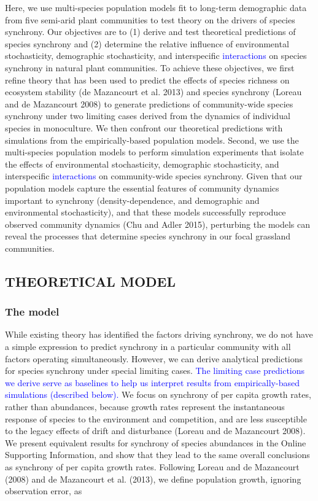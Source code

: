 \documentclass[12pt,]{article}
\begin{document}
Here, we use multi-species population models fit to long-term
demographic data from five semi-arid plant communities to test theory on
the drivers of species synchrony. Our objectives are to (1) derive and
test theoretical predictions of species synchrony and (2) determine the
relative influence of environmental stochasticity, demographic
stochasticity, and interspecific \textcolor{blue}{interactions} on
species synchrony in natural plant communities. To achieve these
objectives, we first refine theory that has been used to predict the
effects of species richness on ecosystem stability ({{de Mazancourt}} et
al. 2013) and species synchrony (Loreau and {{de Mazancourt}} 2008) to
generate predictions of community-wide species synchrony under two
limiting cases derived from the dynamics of individual species in
monoculture. We then confront our theoretical predictions with
simulations from the empirically-based population models. Second, we use
the multi-species population models to perform simulation experiments
that isolate the effects of environmental stochasticity, demographic
stochasticity, and interspecific \textcolor{blue}{interactions} on
community-wide species synchrony. Given that our population models
capture the essential features of community dynamics important to
synchrony (density-dependence, and demographic and environmental
stochasticity), and that these models successfully reproduce observed
community dynamics (Chu and Adler 2015), perturbing the models can
reveal the processes that determine species synchrony in our focal
grassland communities.

\subsection{THEORETICAL MODEL}\label{theoretical-model}

\subsubsection{The model}\label{the-model}

While existing theory has identified the factors driving synchrony, we
do not have a simple expression to predict synchrony in a particular
community with all factors operating simultaneously. However, we can
derive analytical predictions for species synchrony under special
limiting cases.
\textcolor{blue}{The limiting case predictions we derive serve as baselines to help us interpret results from empirically-based simulations (described below).}
We focus on synchrony of per capita growth rates, rather than
abundances, because growth rates represent the instantaneous response of
species to the environment and competition, and are less susceptible to
the legacy effects of drift and disturbance (Loreau and {{de
Mazancourt}} 2008). We present equivalent results for synchrony of
species abundances in the Online Supporting Information, and show that
they lead to the same overall conclusions as synchrony of per capita
growth rates. Following Loreau and {{de Mazancourt}} (2008) and {{de
Mazancourt}} et al. (2013), we define population growth, ignoring
observation error, as
\end{document}
